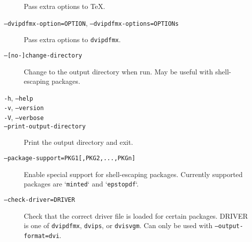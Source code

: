 \documentclass[a4paper]{report}
\newcommand\metavar[1]{\textnormal{\textsf{#1}}}
\begin{document}
\begin{description}
  Pass extra options to \TeX.
\item[\texttt{--dvipdfmx-option=\metavar{OPTION}}, \texttt{--dvipdfmx-options=\metavar{OPTIONs}}]
  Pass extra options to \texttt{dvipdfmx}.
\item[\texttt{--[no-]change-directory}]
  Change to the output directory when run.
  May be useful with shell-escaping packages.
\item[\texttt{-h}, \texttt{--help}]
\item[\texttt{-v}, \texttt{--version}]
\item[\texttt{-V}, \texttt{--verbose}]
\item[\texttt{--print-output-directory}]
  Print the output directory and exit.
\item[\texttt{--package-support=PKG1[,PKG2,...,PKGn]}]
  Enable special support for shell-escaping packages.
  Currently supported packages are `\texttt{minted}` and `\texttt{epstopdf}`.
\item[\texttt{--check-driver=DRIVER}]
  Check that the correct driver file is loaded for certain packages.
  \metavar{DRIVER} is one of \texttt{dvipdfmx}, \texttt{dvips}, or \texttt{dvisvgm}.
  Can only be used with \texttt{--output-format=dvi}.
\end{description}
\end{document}
